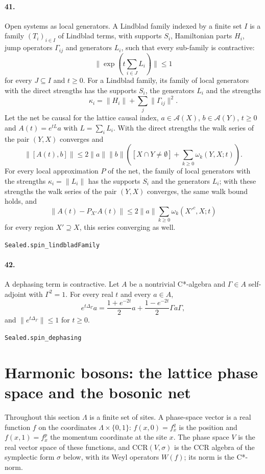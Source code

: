 \documentclass[11pt]{article}
\begin{document}
\paragraph{41.} Open systems as local generators. A Lindblad family indexed by a finite set $I$ is a family $(T_i)_{i \in I}$ of Lindblad terms, with supports $S_i$, Hamiltonian parts $H_i$, jump operators $\Gamma_{ij}$ and generators $L_i$, such that every sub-family is contractive: \[\|\exp(t \sum_{i \in J} L_i)\| \le 1\] for every $J \subseteq I$ and $t \ge 0$. For a Lindblad family, its family of local generators with the direct strengths has the supports $S_i$, the generators $L_i$ and the strengths \[\kappa_i = \|H_i\| + \sum_j \|\Gamma_{ij}\|^2.\] Let the net be causal for the lattice causal index, $a \in \mathcal A(X)$, $b \in \mathcal A(Y)$, $t \ge 0$ and $A(t) = e^{tL} a$ with $L = \sum_i L_i$. With the direct strengths the walk series of the pair $(Y, X)$ converges and \[\|[A(t), b]\| \le 2\|a\|\|b\|([X \cap Y \neq \emptyset] + \sum_{k \ge 0} \omega_k(Y, X; t)).\] For every local approximation $P$ of the net, the family of local generators with the strengths $\kappa_i = \|L_i\|$ has the supports $S_i$ and the generators $L_i$; with these strengths the walk series of the pair $(Y, X)$ converges, the same walk bound holds, and \[\|A(t) - P_{X'} A(t)\| \le 2\|a\| \sum_{k \ge 0} \omega_k(X'^c, X; t)\] for every region $X' \supseteq X$, this series converging as well.\par{\footnotesize\texttt{Sealed.spin\_lindbladFamily}}

\paragraph{42.} A dephasing term is contractive. Let $A$ be a nontrivial C*-algebra and $\Gamma \in A$ self-adjoint with $\Gamma^2 = 1$. For every real $t$ and every $a \in A$, \[e^{t \Delta_\Gamma} a = \frac{1 + e^{-2t}}{2} a + \frac{1 - e^{-2t}}{2} \Gamma a \Gamma,\] and $\|e^{t \Delta_\Gamma}\| \le 1$ for $t \ge 0$.\par{\footnotesize\texttt{Sealed.spin\_dephasing}}

\section*{Harmonic bosons: the lattice phase space and the bosonic net}
Throughout this section $\Lambda$ is a finite set of sites. A phase-space vector is a real function $f$ on the coordinates $\Lambda \times \{0, 1\}$: $f(x, 0) = f^q_x$ is the position and $f(x, 1) = f^p_x$ the momentum coordinate at the site $x$. The phase space $V$ is the real vector space of these functions, and $\mathrm{CCR}(V, \sigma)$ is the CCR algebra of the symplectic form $\sigma$ below, with its Weyl operators $W(f)$; its norm is the C*-norm.
\end{document}
